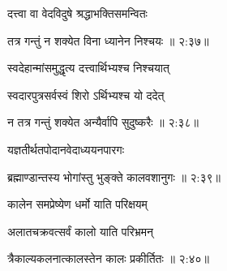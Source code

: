 {\devanagarifont दत्त्वा वा वेदविदुषे श्रद्धाभक्तिसमन्वितः  \danda\dontdisplaylinenum }%
 

{\devanagarifont तत्र गन्तुं न शक्येत विना ध्यानेन निश्चयः {॥ २:३७॥} \veg\dontdisplaylinenum }%

{\devanagarifont स्वदेहान्मांसमुद्धृत्य दत्त्वार्थिभ्यश्च निश्चयात् \thinspace{\dandab} \dontdisplaylinenum }%

{\devanagarifont स्वदारपुत्रसर्वस्वं शिरो ऽर्थिभ्यश्च यो ददेत्  \danda\dontdisplaylinenum }%


{\devanagarifont न तत्र गन्तुं शक्येत अन्यैर्वापि सुदुष्करैः {॥ २:३८॥} \veg\dontdisplaylinenum }%

{\devanagarifont यज्ञतीर्थतपोदानवेदाध्ययनपारगः \thinspace{\dandab} \dontdisplaylinenum }%


{\devanagarifont ब्रह्माण्डान्तस्य भोगांस्तु भुङ्क्ते कालवशानुगः {॥ २:३९॥} \veg\dontdisplaylinenum }%

{\devanagarifont कालेन समप्रेष्येण धर्मो याति परिक्षयम् \thinspace{\dandab} \dontdisplaylinenum }%

{\devanagarifont अलातचक्रवत्सर्वं कालो याति परिभ्रमन्  \danda\dontdisplaylinenum }%
 

{\devanagarifont त्रैकाल्यकलनात्कालस्तेन कालः प्रकीर्तितः {॥ २:४०॥} \veg\dontdisplaylinenum }%


